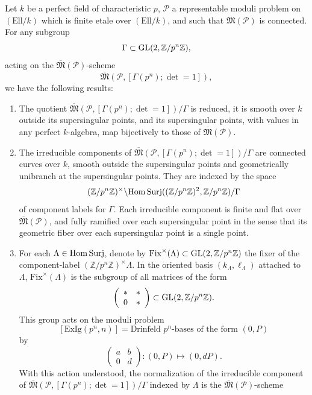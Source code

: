\begin{kthm}\label{thm:13.10.3}
Let $k$ be a perfect field of characteristic $p$, $\mathcal{P}$ a representable moduli problem on $(\mathrm{Ell}/k)$ which is finite etale over $(\mathrm{Ell}/k)$, and such that $\mathfrak{M}(\mathcal{P})$ is connected. For any subgroup
\[
\Gamma \subset \operatorname{GL}(2, \mathbb{Z}/p^n\mathbb{Z}) ,
\]
acting on the $\overline{\mathfrak{M}}(\mathcal{P})$-scheme
\[
\overline{\mathfrak{M}}(\mathcal{P}, [\Gamma(p^n); \det = 1]) ,
\]
we have the following results:
\begin{enumerate}[label=(\arabic*), leftmargin=2.4em]
\item The quotient $\overline{\mathfrak{M}}(\mathcal{P}, [\Gamma(p^n); \det = 1])/\Gamma$ is reduced, it is smooth over $k$ outside its supersingular points, and its supersingular points, with values in any perfect $k$-algebra, map bijectively to those of $\overline{\mathfrak{M}}(\mathcal{P})$.
\item The irreducible components of $\overline{\mathfrak{M}}(\mathcal{P}, [\Gamma(p^n); \det = 1])/\Gamma$ are connected curves over $k$, smooth outside the supersingular points and geometrically unibranch at the supersingular points. They are indexed by the space
\[
(\mathbb{Z}/p^n\mathbb{Z})^\times \backslash \mathrm{Hom\,Surj}((\mathbb{Z}/p^n\mathbb{Z})^2, \mathbb{Z}/p^n\mathbb{Z})/\Gamma
\]
of component labels for $\Gamma$. Each irreducible component is finite and flat over $\overline{\mathfrak{M}}(\mathcal{P})$, and fully ramified over each supersingular point in the sense that its geometric fiber over each supersingular point is a single point.
\item For each $\Lambda \in \mathrm{Hom\,Surj}$, denote by $\mathrm{Fix}^\times(\Lambda) \subset \operatorname{GL}(2,\mathbb{Z}/p^n\mathbb{Z})$ the fixer of the component-label $(\mathbb{Z}/p^n\mathbb{Z})^\times \Lambda$. In the oriented basis $(k_\Lambda, \ell_\Lambda)$ attached to $\Lambda$, $\mathrm{Fix}^\times(\Lambda)$ is the subgroup of all matrices of the form
\[
\left(\begin{array}{cc} * & * \\ 0 & * \end{array}\right) \subset \operatorname{GL}(2, \mathbb{Z}/p^n\mathbb{Z}) .
\]
This group acts on the moduli problem
\[
[\mathrm{ExIg}(p^n, n)] = \text{Drinfeld } p^n\text{-bases of the form } (0,P)
\]
by
\[
\left(\begin{array}{cc} a & b \\ 0 & d \end{array}\right) : (0,P) \mapsto (0, dP) .
\]
With this action understood, the normalization of the irreducible component of $\overline{\mathfrak{M}}(\mathcal{P}, [\Gamma(p^n); \det = 1])/\Gamma$ indexed by $\Lambda$ is the $\overline{\mathfrak{M}}(\mathcal{P})$-scheme

\end{enumerate}
\end{kthm}
